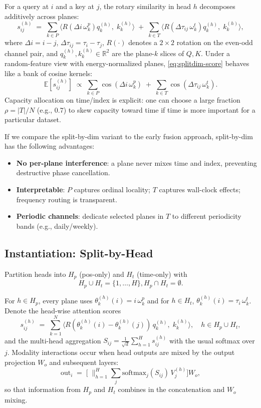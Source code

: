 \documentclass[sigconf]{acmart}
\begin{document}
For a query at $i$ and a key at $j$, the rotary similarity in head $h$ decomposes additively across planes:
\begin{equation}
\label{eq:splitdim-score}
s^{(h)}_{ij}
\;=\;
\sum_{k\in P} \big\langle R(\Delta i\,\omega^p_k) q^{(h)}_k,\; k^{(h)}_k \big\rangle
\;+\;
\sum_{k\in T} \big\langle R(\Delta \tau_{ij}\,\omega^t_k) q^{(h)}_k,\; k^{(h)}_k \big\rangle,
\end{equation}
where $\Delta i{=}i{-}j$, $\Delta\tau_{ij}{=}\tau_i{-}\tau_j$, $R(\cdot)$ denotes a $2{\times}2$ rotation on the even-odd channel pair, and $q^{(h)}_k,k^{(h)}_k\in\mathbb{R}^2$ are the plane-$k$ slices of $Q,K$.
Under a random-feature view with energy-normalized planes, \eqref{eq:splitdim-score} behaves like a bank of cosine kernels:
\[
\mathbb{E}[s^{(h)}_{ij}] \;\propto\;
\sum_{k\in P}\cos(\Delta i\,\omega^p_k)
\;+\;
\sum_{k\in T}\cos(\Delta \tau_{ij}\,\omega^t_k).
\]
Capacity allocation on time/index is explicit: one can choose a large fraction $\rho{=}|T|/N$ (e.g., $0.7$) to skew capacity toward time if time is more important for a particular dataset.

If we compare the split-by-dim variant to the early fusion approach, split-by-dim has the following advantages:
\begin{itemize}
\item \textbf{No per-plane interference}: a plane never mixes time and index, preventing destructive phase cancellation.
\item \textbf{Interpretable}: $P$ captures ordinal locality; $T$ captures wall-clock effects; frequency routing is transparent.
\item \textbf{Periodic channels}: dedicate selected planes in $T$ to different periodicity bands (e.g., daily/weekly).
\end{itemize}

\subsection{Instantiation: Split-by-Head}
\label{subsec:split-head}
Partition heads into $H_p$ (pos-only) and $H_t$ (time-only) with 
\[H_p{\cup}H_t{=}\{1,\dots,H\}, H_p{\cap}H_t{=}\emptyset.\]

For $h\in H_p$, every plane uses $\theta^{(h)}_k(i)=i\,\omega^p_k$ and for $h\in H_t$, $\theta^{(h)}_k(i)=\tau_i\,\omega^t_k$. Denote the head-wise attention scores
\[
s^{(h)}_{ij} \;=\; \sum_{k=1}^{N} \big\langle R(\theta^{(h)}_k(i)-\theta^{(h)}_k(j))\, q^{(h)}_k,\; k^{(h)}_k \big\rangle,
\quad
h\in H_p\cup H_t,
\]
and the multi-head aggregation $S_{ij} = \frac{1}{\sqrt{d}}\sum_{h=1}^{H} s^{(h)}_{ij}$ with the usual softmax over $j$.
Modality interactions occur when head outputs are mixed by the output projection $W_o$ and subsequent layers:
\[
\mathrm{out}_i \;=\; \bigg[\;\big\|_{h=1}^{H} \sum_j \mathrm{softmax}_j(S_{ij})\, V^{(h)}_j\bigg] W_o,
\]
so that information from $H_p$ and $H_t$ combines in the concatenation and $W_o$ mixing.
\end{document}
